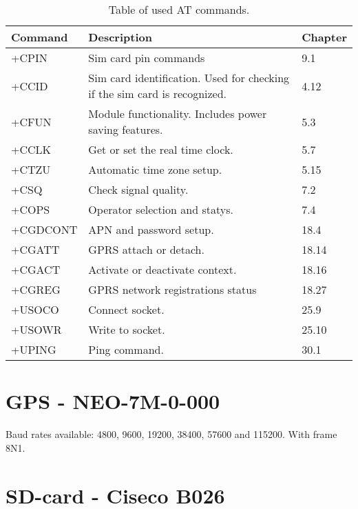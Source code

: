 \begin{table}
	\begin{tabularx}{\textwidth}{l X X}
		\toprule
		Command & Description & Chapter \\
		\midrule
		+CPIN & Sim card pin commands & 9.1 \\
		+CCID & Sim card identification. Used for checking if the sim card is recognized. & 4.12 \\
		+CFUN & Module functionality. Includes power saving features. & 5.3 \\
		+CCLK & Get or set the real time clock. & 5.7 \\
		+CTZU & Automatic time zone setup. & 5.15 \\
		+CSQ & Check signal quality. & 7.2 \\
		+COPS & Operator selection and statys. & 7.4 \\
		+CGDCONT & APN and password setup. & 18.4 \\
		+CGATT & GPRS attach or detach. & 18.14 \\
		+CGACT & Activate or deactivate context. & 18.16 \\
		+CGREG & GPRS network registrations status & 18.27 \\
		+USOCO & Connect socket. & 25.9 \\
		+USOWR & Write to socket. & 25.10 \\
		+UPING & Ping command. & 30.1 \\
		\bottomrule
	\end{tabularx}
	\caption{Table of used AT commands.}
	\label{tab:ATcomm}
\end{table}

\section{GPS - NEO-7M-0-000}
Baud rates available: \num{4800}, \num{9600}, \num{19200}, \num{38400}, \num{57600} and \num{115200}. With frame 8N1.

\cite{MKRSchem}

\section{SD-card - Ciseco B026}

\FloatBarrier
